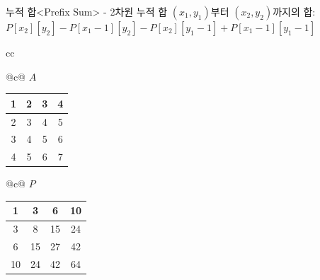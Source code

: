 \begin{frame}{누적 합}{<Prefix Sum> - 2차원 누적 합}
  $(x_1, y_1)$부터 $(x_2, y_2)$까지의 합:
  $P[x_2][y_2] - P[x_1{-}1][y_2] - P[x_2][y_1{-}1] + P[x_1{-}1][y_1{-}1]$
  \vspace{4mm}
  \begin{center}
    \begin{tabular}{cc}
      \begin{tabular}{@{}c@{}}
        {\aloharegular $A$}\\[1mm]
        \begin{tabular}{|c|c|c|c|}
          \hline
          1 & 2 & 3 & 4 \\ \hline
          2 & \cellcolor{aloha-highlight}3 & \cellcolor{aloha-highlight}4
            & \cellcolor{aloha-highlight}5 \\ \hline
          3 & \cellcolor{aloha-highlight}4 & \cellcolor{aloha-highlight}5
            & \cellcolor{aloha-highlight}6 \\ \hline
          4 & 5 & 6 & 7 \\ \hline
        \end{tabular}
      \end{tabular}
      \hspace{18mm}
      \begin{tabular}{@{}c@{}}
        {\aloharegular $P$}\\[1mm]
        \begin{tabular}{|c|c|c|c|}
          \hline
          1  & 3  & 6  & 10 \\ \hline
          3  & 8  & 15 & 24 \\ \hline
          6  & 15 & 27 & 42 \\ \hline
          10 & 24 & 42 & 64 \\ \hline
        \end{tabular}
      \end{tabular}
    \end{tabular}
  \end{center}
\end{frame}

